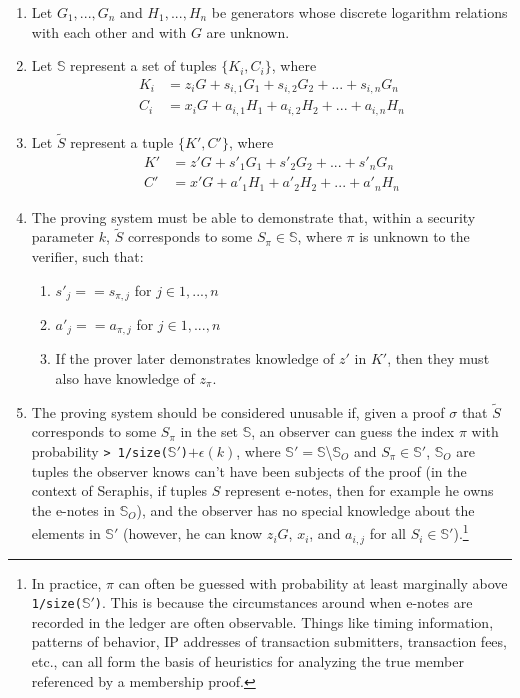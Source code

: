 \begin{enumerate}
    \item Let $G_1,...,G_n$ and $H_1,...,H_n$ be generators whose discrete logarithm relations with each other and with $G$ are unknown.

    \item Let $\mathbb{S}$ represent a set of tuples $\{K_i, C_i\}$, where\vspace{.115cm}
    \begin{align*}
        K_i &= z_i G + s_{i,1} G_1 + s_{i,2} G_2 + ... + s_{i,n} G_n \\
        C_i &= x_i G + a_{i,1} H_1 + a_{i,2} H_2 + ... + a_{i,n} H_n
    \end{align*}

    \item Let $\tilde{S}$ represent a tuple $\{K', C'\}$, where\vspace{.115cm}
    \begin{align*}
        K' &= z' G + s'_1 G_1 + s'_2 G_2 + ... + s'_n G_n \\
        C' &= x' G + a'_1 H_1 + a'_2 H_2 + ... + a'_n H_n
    \end{align*}

    \item The proving system must be able to demonstrate that, within a security parameter $k$, $\tilde{S}$ corresponds to some $S_{\pi} \in \mathbb{S}$, where $\pi$ is unknown to the verifier, such that:
    \begin{enumerate}
        \item $s'_j == s_{\pi,j}$ for $j \in 1,...,n$
        \item $a'_j == a_{\pi,j}$ for $j \in 1,...,n$
        \item If the prover later demonstrates knowledge of $z'$ in $K'$, then they must also have knowledge of $z_{\pi}$.
    \end{enumerate}
    
    \item The proving system should be considered unusable if, given a proof $\sigma$ that $\tilde{S}$ corresponds to some $S_{\pi}$ in the set $\mathbb{S}$, an observer can guess the index $\pi$ with probability {\tt > 1/size(}$\mathbb{S}'${\tt )}$+ \epsilon(k)$, where $\mathbb{S}' = \mathbb{S}$\textbackslash$\mathbb{S}_O$ and $S_{\pi} \in \mathbb{S}'$, $\mathbb{S}_O$ are tuples the observer knows can't have been subjects of the proof (in the context of Seraphis, if tuples $S$ represent e-notes, then for example he owns the e-notes in $\mathbb{S}_O$), and the observer has no special knowledge about the elements in $\mathbb{S}'$ (however, he can know $z_i G$, $x_i$, and $a_{i,j}$ for all $S_i \in \mathbb{S}'$).\footnote{In practice, $\pi$ can often be guessed with probability at least marginally above {\tt 1/size(}$\mathbb{S}'${\tt )}. This is because the circumstances around when e-notes are recorded in the ledger are often observable. Things like timing information, patterns of behavior, IP addresses of transaction submitters, transaction fees, etc., can all form the basis of heuristics for analyzing the true member referenced by a membership proof.}
\end{enumerate}

